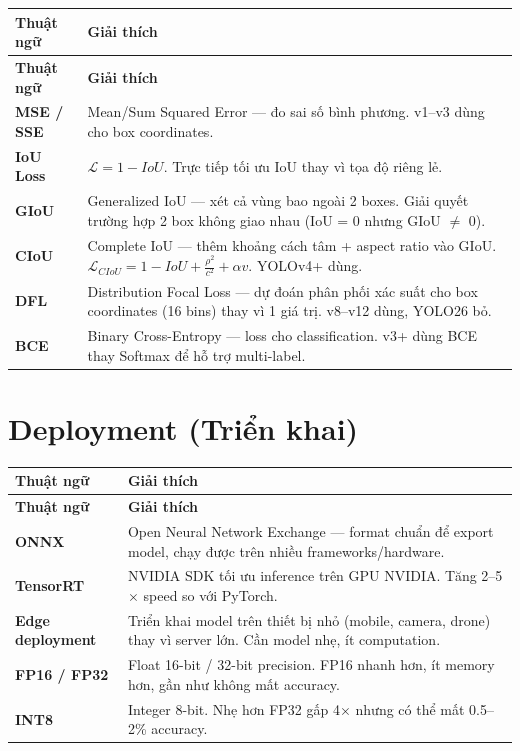 \begin{longtable}{p{3.5cm}p{12cm}}
\toprule
\textbf{Thuật ngữ} & \textbf{Giải thích} \\
\midrule
\endfirsthead
\toprule
\textbf{Thuật ngữ} & \textbf{Giải thích} \\
\midrule
\endhead

\textbf{MSE / SSE} & Mean/Sum Squared Error --- đo sai số bình phương. v1--v3 dùng cho box coordinates. \\
\midrule
\textbf{IoU Loss} & $\mathcal{L} = 1 - IoU$. Trực tiếp tối ưu IoU thay vì tọa độ riêng lẻ. \\
\midrule
\textbf{GIoU} & Generalized IoU --- xét cả vùng bao ngoài 2 boxes. Giải quyết trường hợp 2 box không giao nhau (IoU = 0 nhưng GIoU $\neq$ 0). \\
\midrule
\textbf{CIoU} & Complete IoU --- thêm khoảng cách tâm + aspect ratio vào GIoU. $\mathcal{L}_{CIoU} = 1 - IoU + \frac{\rho^2}{c^2} + \alpha v$. YOLOv4+ dùng. \\
\midrule
\textbf{DFL} & Distribution Focal Loss --- dự đoán phân phối xác suất cho box coordinates (16 bins) thay vì 1 giá trị. v8--v12 dùng, YOLO26 bỏ. \\
\midrule
\textbf{BCE} & Binary Cross-Entropy --- loss cho classification. v3+ dùng BCE thay Softmax để hỗ trợ multi-label. \\
\bottomrule
\end{longtable}

\section*{Deployment (Triển khai)}

\begin{longtable}{p{3.5cm}p{12cm}}
\toprule
\textbf{Thuật ngữ} & \textbf{Giải thích} \\
\midrule
\endfirsthead
\toprule
\textbf{Thuật ngữ} & \textbf{Giải thích} \\
\midrule
\endhead

\textbf{ONNX} & Open Neural Network Exchange --- format chuẩn để export model, chạy được trên nhiều frameworks/hardware. \\
\midrule
\textbf{TensorRT} & NVIDIA SDK tối ưu inference trên GPU NVIDIA. Tăng 2--5$\times$ speed so với PyTorch. \\
\midrule
\textbf{Edge deployment} & Triển khai model trên thiết bị nhỏ (mobile, camera, drone) thay vì server lớn. Cần model nhẹ, ít computation. \\
\midrule
\textbf{FP16 / FP32} & Float 16-bit / 32-bit precision. FP16 nhanh hơn, ít memory hơn, gần như không mất accuracy. \\
\midrule
\textbf{INT8} & Integer 8-bit. Nhẹ hơn FP32 gấp 4$\times$ nhưng có thể mất 0.5--2\% accuracy. \\
\bottomrule
\end{longtable}
